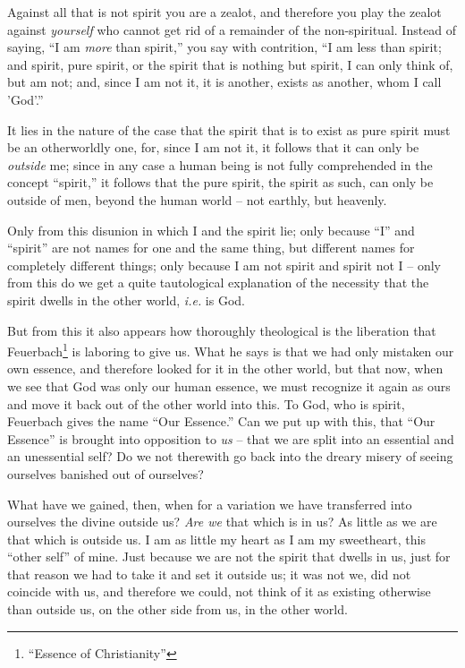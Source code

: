 Against all that is not spirit you are a zealot, and therefore you play the 
zealot against \textit{yourself} who cannot get rid of a remainder of the 
non-spiritual. Instead of saying, ``I am \textit{more} than spirit,'' you 
say with contrition, ``I am less than spirit; and spirit, pure spirit, or the 
spirit that is nothing but spirit, I can only think of, but am not; and, since 
I am not it, it is another, exists as another, whom I call 'God'.''

It lies in the nature of the case that the spirit that is to exist as pure 
spirit must be an otherworldly one, for, since I am not it, it follows that it 
can only be \textit{outside} me; since in any case a human being is not fully 
comprehended in the concept ``spirit,'' it follows that the pure spirit, the 
spirit as such, can only be outside of men, beyond the human world -- not 
earthly, but heavenly.

Only from this disunion in which I and the spirit lie; only because ``I'' 
and ``spirit'' are not names for one and the same thing, but different names 
for completely different things; only because I am not spirit and spirit not I 
-- only from this do we get a quite tautological explanation of the necessity 
that the spirit dwells in the other world, \textit{i.e.} is God.

But from this it also appears how thoroughly theological is the liberation 
that Feuerbach\footnote{``Essence of Christianity''} is laboring to give us. 
What he says is that we had only mistaken our own essence, and therefore 
looked for it in the other world, but that now, when we see that God was only 
our human essence, we must recognize it again as ours and move it back out of 
the other world into this. To God, who is spirit, Feuerbach gives the name 
``Our Essence.'' Can we put up with this, that ``Our Essence'' is brought 
into opposition to \textit{us} -- that we are split into an essential and an 
unessential self? Do we not therewith go back into the dreary misery of seeing 
ourselves banished out of ourselves?

What have we gained, then, when for a variation we have transferred into 
ourselves the divine outside us? \textit{Are we} that which is in us? As 
little as we are that which is outside us. I am as little my heart as I am my 
sweetheart, this ``other self'' of mine. Just because we are not the spirit 
that dwells in us, just for that reason we had to take it and set it outside 
us; it was not we, did not coincide with us, and therefore we could, not think 
of it as existing otherwise than outside us, on the other side from us, in the 
other world.

